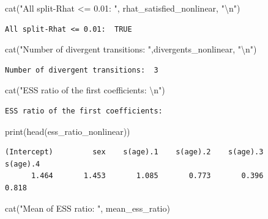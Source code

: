 \documentclass[
  letterpaper,
  DIV=11,
  numbers=noendperiod]{scrartcl}
\newenvironment{Shaded}{\begin{snugshade}}{\end{snugshade}}
\newcommand{\FunctionTok}[1]{\textcolor[rgb]{0.28,0.35,0.67}{#1}}
\newcommand{\NormalTok}[1]{\textcolor[rgb]{0.00,0.23,0.31}{#1}}
\newcommand{\SpecialCharTok}[1]{\textcolor[rgb]{0.37,0.37,0.37}{#1}}
\newcommand{\StringTok}[1]{\textcolor[rgb]{0.13,0.47,0.30}{#1}}
\begin{document}
\begin{Shaded}
\begin{Highlighting}[]
\FunctionTok{cat}\NormalTok{(}\StringTok{"All split{-}Rhat \textless{}= 0.01: "}\NormalTok{, rhat\_satisfied\_nonlinear, }\StringTok{"}\SpecialCharTok{\textbackslash{}n}\StringTok{"}\NormalTok{)}
\end{Highlighting}
\end{Shaded}

\begin{verbatim}
All split-Rhat <= 0.01:  TRUE 
\end{verbatim}

\begin{Shaded}
\begin{Highlighting}[]
\FunctionTok{cat}\NormalTok{(}\StringTok{"Number of divergent transitions: "}\NormalTok{,divergents\_nonlinear, }\StringTok{"}\SpecialCharTok{\textbackslash{}n}\StringTok{"}\NormalTok{)}
\end{Highlighting}
\end{Shaded}

\begin{verbatim}
Number of divergent transitions:  3 
\end{verbatim}

\begin{Shaded}
\begin{Highlighting}[]
\FunctionTok{cat}\NormalTok{(}\StringTok{"ESS ratio of the first coefficients: }\SpecialCharTok{\textbackslash{}n}\StringTok{"}\NormalTok{)}
\end{Highlighting}
\end{Shaded}

\begin{verbatim}
ESS ratio of the first coefficients: 
\end{verbatim}

\begin{Shaded}
\begin{Highlighting}[]
\FunctionTok{print}\NormalTok{(}\FunctionTok{head}\NormalTok{(ess\_ratio\_nonlinear))}
\end{Highlighting}
\end{Shaded}

\begin{verbatim}
(Intercept)         sex    s(age).1    s(age).2    s(age).3    s(age).4 
      1.464       1.453       1.085       0.773       0.396       0.818 
\end{verbatim}

\begin{Shaded}
\begin{Highlighting}[]
\FunctionTok{cat}\NormalTok{(}\StringTok{"Mean of ESS ratio: "}\NormalTok{, mean\_ess\_ratio)}
\end{Highlighting}
\end{Shaded}
\end{document}
